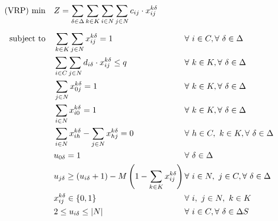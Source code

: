\documentclass[preprint,review,12pt]{elsarticle}
\begin{document}
\begin{align}
	\text{(VRP) min} \quad      & Z = \sum\limits_{\delta\in \Delta} \sum\limits_{k\in K}\sum\limits_{i\in N}\sum\limits_{j\in N} c_{ij} \cdot x_{ij}^{k\delta}    && \label{PCVRP_FObj}    \\[5pt]
	\noindent \text{subject to} \quad & \sum\limits_{k \in K}\sum\limits_{j \in N} x_{ij}^{k\delta} = 1                    && \text{\hspace{-1cm}} \forall \ i \in C, \forall \ \delta \in \Delta \label{PCVRP_Service} \\
	& \sum\limits_{i \in C}\sum\limits_{j \in N}d_{i\delta} \cdot x_{ij}^{k\delta} \leq q                 && \text{\hspace{-1cm}} \forall \ k \in K, \forall \ \delta \in \Delta  \label{PCVRP_Capacity} \\
	& \sum\limits_{j \in N}x_{0j}^{k\delta} = 1                                             && \text{\hspace{-1cm}} \forall \ k \in K, \forall \ \delta \in \Delta \label{PCVRP_StartRoute} \\
	& \sum\limits_{i \in N}x_{i0}^{k\delta} = 1                                             && \text{\hspace{-1cm}} \forall \ k \in K, \forall \ \delta \in \Delta \label{PCVRP_EndRoute} \\
	& \sum\limits_{i \in N}x_{ih}^{k\delta} - \sum\limits_{j \in N}x_{hj}^{k\delta} = 0             && \text{\hspace{-1cm}} \forall \ h \in C,\ k \in K, \forall \ \delta \in \Delta \label{PCVRP_Balance} \\
	& u_{0\delta} = 1                                                                       && \text{\hspace{-1cm}} \forall \ \delta \in \Delta \label{PCVRP_InitialU}\\
	& u_{j\delta} \geq (u_{i\delta} + 1) - M \left(1 - \sum\limits_{k \in K}x_{ij}^{k\delta} \right) \qquad && \text{\hspace{-1cm}} \forall \ i \in N,\ j \in C, \forall \ \delta \in \Delta \label{PCVRP_OrderU}\\
	& x_{ij}^{k\delta} \in\{0,1\}                                                         && \text{\hspace{-1cm}} \forall \ i, \ j \in N,\ k \in K \label{PCVRP_DomainX}\\
	& 2 \leq u_{i\delta} \leq |N|                                                           && \text{\hspace{-1cm}} \forall \ i \in C, \forall \ \delta \in \Delta \label{PCVRP_DomainU}
S\end{align}
\end{document}

